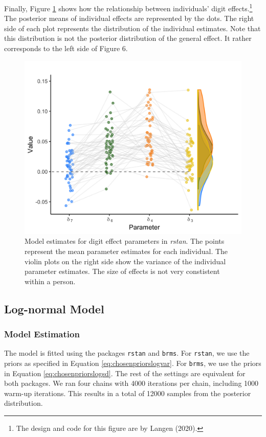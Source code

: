 \documentclass[
  english,
  doc,floatsintext]{apa6}
\begin{document}
Finally, Figure \ref{fig:modelestimatesfigure3} shows how the relationship between individuals' digit effects.\footnote{The design and code for this figure are by Langen (2020).} The posterior means of individual effects are represented by the dots. The right side of each plot represents the distribution of the individual estimates. Note that this distribution is not the posterior distribution of the general effect. It rather corresponds to the left side of Figure 6.

\begin{figure}[H]

\includegraphics[width=0.75\linewidth]{Images/Fig11_modelestimatefigure2_onlyrstan_v2} \hfill{}

\caption{Model estimates for digit effect parameters in \textit{rstan}. The points represent the mean parameter estimates for each individual. The violin plots on the right side show the variance of the individual parameter estimates. The size of effects is not very constistent within a person.}\label{fig:modelestimatesfigure3}
\end{figure}

\hypertarget{log-normal-model-2}{%
\subsection{Log-normal Model}\label{log-normal-model-2}}

\hypertarget{model-estimation}{%
\subsubsection{Model Estimation}\label{model-estimation}}

The model is fitted using the packages \texttt{rstan} and \texttt{brms}. For \texttt{rstan}, we use the priors as specified in Equation \eqref{eq:chosenpriorslogvar}. For \texttt{brms}, we use the priors in Equation \eqref{eq:chosenpriorslogsd}. The rest of the settings are equivalent for both packages. We ran four chains with 4000 iterations per chain, including 1000 warm-up iterations. This results in a total of 12000 samples from the posterior distribution.
\end{document}
